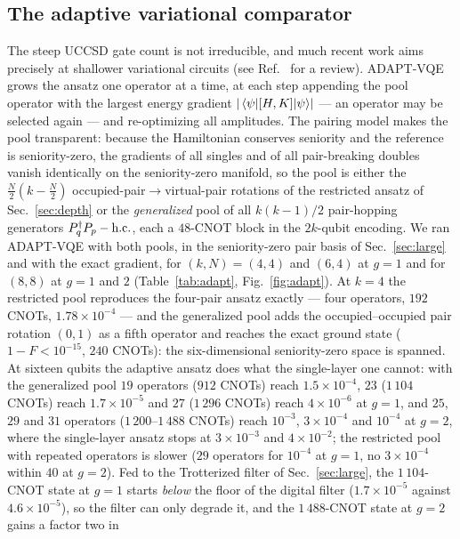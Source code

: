 \documentclass[
  aps,            %
  prc,            %
  reprint,        %
  superscriptaddress,
  floatfix,
  nofootinbib
]{revtex4-2}
\begin{document}
\subsection{The adaptive variational comparator}
\label{sec:adapt}
The steep UCCSD gate count is not irreducible, and much recent work aims
precisely at shallower variational circuits (see Ref.~\cite{Tilly2022} for a
review).  ADAPT-VQE~\cite{Grimsley2019} grows the ansatz one operator at a
time, at each step appending the pool operator with the largest energy
gradient $\abs{\expval{[H,K]}{\psi}}$ --- an operator may be selected again
--- and re-optimizing all amplitudes.  The pairing model makes the pool
transparent: because the Hamiltonian conserves seniority and the reference
is seniority-zero, the gradients of all singles and of all pair-breaking
doubles vanish identically on the seniority-zero manifold, so the pool is
either the $\frac N2(k-\frac N2)$ occupied-pair$\to$virtual-pair rotations
of the restricted ansatz of Sec.~\ref{sec:depth} or the \emph{generalized}
pool of all $k(k-1)/2$ pair-hopping generators $P_q^\dagger P_p-{\rm h.c.}$,
each a $48$-CNOT block in the $2k$-qubit encoding.  We ran ADAPT-VQE with
both pools, in the seniority-zero pair basis of Sec.~\ref{sec:large} and
with the exact gradient, for $(k,N)=(4,4)$ and $(6,4)$ at $g=1$ and for
$(8,8)$ at $g=1$ and $2$ (Table~\ref{tab:adapt}, Fig.~\ref{fig:adapt}).
At $k=4$ the restricted pool reproduces the four-pair ansatz exactly ---
four operators, $192$ CNOTs, $1.78\times10^{-4}$ --- and the generalized
pool adds the occupied--occupied pair rotation $(0,1)$ as a fifth operator
and reaches the exact ground state ($1-F<10^{-15}$, $240$ CNOTs): the
six-dimensional seniority-zero space is spanned.  At sixteen qubits the
adaptive ansatz does what the single-layer one cannot: with the
generalized pool $19$ operators ($912$ CNOTs) reach $1.5\times10^{-4}$,
$23$ ($1\,104$ CNOTs) reach $1.7\times10^{-5}$ and $27$ ($1\,296$ CNOTs)
reach $4\times10^{-6}$ at $g=1$, and $25$, $29$ and $31$ operators
($1\,200$--$1\,488$ CNOTs) reach $10^{-3}$, $3\times10^{-4}$ and $10^{-4}$
at $g=2$, where the single-layer ansatz stops at $3\times10^{-3}$ and
$4\times10^{-2}$; the restricted pool with repeated operators is slower
($29$ operators for $10^{-4}$ at $g=1$, no $3\times10^{-4}$ within $40$ at
$g=2$).  Fed to the Trotterized filter of Sec.~\ref{sec:large}, the
$1\,104$-CNOT state at $g=1$ starts \emph{below} the floor of the digital
filter ($1.7\times10^{-5}$ against $4.6\times10^{-5}$), so the filter can
only degrade it, and the $1\,488$-CNOT state at $g=2$ gains a factor two in
\end{document}
